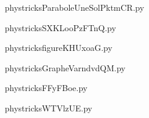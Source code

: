     \newcommand{\CaptionFigParaboleUneSolPktmCR}{<+Type your caption here+>}
    \begin{center}
        
    \end{center}
    phystricksParaboleUneSolPktmCR.py

    

    \clearpage
    


    \newcommand{\CaptionFigSXKLooPzFTnQ}{<+Type your caption here+>}
    \begin{center}
        
    \end{center}
    phystricksSXKLooPzFTnQ.py

    

    \clearpage
    


    \newcommand{\CaptionFigfigureKHUxoaG}{<+Type your caption here+>}
    \begin{center}
        
    \end{center}
    phystricksfigureKHUxoaG.py

    

    \clearpage
    


    \newcommand{\CaptionFigGrapheVarndvdQM}{<+Type your caption here+>}
    \begin{center}
        
    \end{center}
    phystricksGrapheVarndvdQM.py

    

    \clearpage
    


    \newcommand{\CaptionFigFFyFBoe}{<+Type your caption here+>}
    \begin{center}
        
    \end{center}
    phystricksFFyFBoe.py

    

    \clearpage
    


    \newcommand{\CaptionFigWTVlzUE}{<+Type your caption here+>}
    \begin{center}
        
    \end{center}
    phystricksWTVlzUE.py

